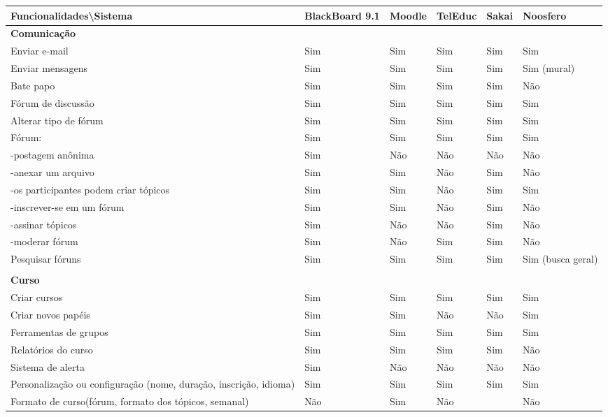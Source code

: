 \begin{table}[h]
\begin{landscape}
\begin{tabular}{@{}p{5cm}|p{3.5cm}|p{3.5cm}|p{2.5cm}|p{2.5cm}|p{3.5cm}@{}}
\toprule
\textbf{Funcionalidades\textbackslash Sistema} & \textbf{BlackBoard 9.1} & \textbf{Moodle} & \textbf{TelEduc} & \textbf{Sakai} & \textbf{Noosfero}\\ \midrule
\textbf{Comunicação} & & & & & \\
Enviar e-mail & Sim & Sim & Sim& Sim   & Sim    \\
Enviar mensagens& Sim & Sim & Sim& Sim   & Sim (mural)\\
Bate papo& Sim & Sim & Sim& Sim   & Não    \\
Fórum de discussão& Sim & Sim & Sim& Sim   & Sim    \\
Alterar tipo de fórum & Sim & Sim & Sim& Sim   & Sim \\
Fórum:   & Sim & Sim & Sim& Sim   & Sim    \\
-postagem anônima & Sim & Não & Não& Não   & Não    \\
-anexar um arquivo& Sim & Sim & Não& Sim   & Não    \\
-os participantes podem criar tópicos   & Sim & Sim & Não& Sim   & Sim    \\
-inscrever-se em um fórum  & Sim & Sim & Não& Sim   & Não    \\
-assinar tópicos& Sim & Não & Não& Sim   & Não    \\
-moderar fórum& Sim & Não & Sim& Sim   & Não    \\
Pesquisar fóruns& Sim & Sim & Sim& Sim   & Sim (busca geral)   \\
 & & & & & \\
\textbf{Curso}&&   &&  &   \\
Criar cursos  & Sim & Sim & Sim  & Sim   & Sim    \\
Criar novos papéis& Sim & Sim & Não& Não   & Sim \\
Ferramentas de grupos & Sim & Sim & Sim& Sim   & Sim \\
Relatórios do curso   & Sim & Sim & Sim& Sim   & Não \\
Sistema de alerta & Sim & Não & Não& Não   & Não \\
Personalização ou configuração (nome, duração, inscrição, idioma) & Sim & Sim & Sim& Sim   & Sim    \\
Formato de curso(fórum, formato dos tópicos, semanal)& Não & Sim & Não&  & Não    \\

\end{tabular}
\end{landscape}
\end{table}
